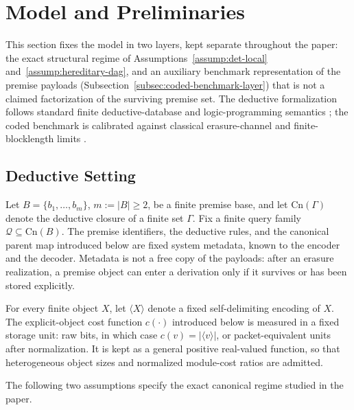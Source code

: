 \documentclass[journal]{IEEEtran}
\newcommand{\Cn}{\text{Cn}}
\numberwithin{equation}{section}
\begin{document}
\section{Model and Preliminaries}
\label{sec:model}

This section fixes the model in two layers, kept separate throughout the
paper: the exact structural regime of Assumptions~\ref{assump:det-local}
and~\ref{assump:hereditary-dag}, and an auxiliary benchmark representation
of the premise payloads (Subsection~\ref{subsec:coded-benchmark-layer})
that is not a claimed factorization of the surviving premise set.  The
deductive formalization follows standard finite deductive-database and
logic-programming semantics
\cite{abiteboul1995foundations,ullman1988database,dantsin2001complexity,green2007provenance};
the coded benchmark is calibrated against classical erasure-channel and
finite-blocklength limits
\cite{shannon1948mathematical,cover2006elements,polyanskiy2010channel}.

\subsection{Deductive Setting}
\label{subsec:deductive-setting}

Let \(B=\{b_1,\ldots,b_m\}\), \(m:=|B|\ge 2\), be a finite premise base,
and let \(\Cn(\Gamma)\) denote the deductive closure of a finite set
\(\Gamma\).  Fix a finite query family \(\mathcal Q\subseteq\Cn(B)\).
The premise identifiers, the deductive rules, and the canonical parent map
introduced below are fixed system metadata, known to the encoder and the
decoder.  Metadata is not a free copy of the payloads: after an erasure
realization, a premise object can enter a derivation only if it survives or
has been stored explicitly.

For every finite object \(X\), let \(\langle X\rangle\) denote a fixed
self-delimiting encoding of \(X\).  The explicit-object cost function
\(c(\cdot)\) introduced below is measured in a fixed storage unit: raw bits,
in which case \(c(v)=\lvert\langle v\rangle\rvert\), or packet-equivalent
units after normalization.  It is kept as a general positive real-valued
function, so that heterogeneous object sizes and normalized module-cost ratios
are admitted.

The following two assumptions specify the exact canonical regime studied in
the paper.
\end{document}
